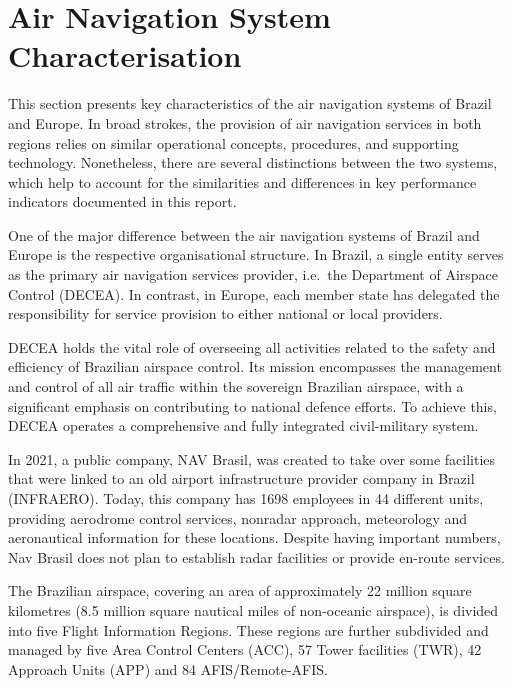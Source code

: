 \documentclass[
  a4paper,
  DIV=11,
  numbers=noendperiod]{scrreport}
\begin{document}

\hypertarget{air-navigation-system-characterisation}{%
\chapter{Air Navigation System
Characterisation}\label{air-navigation-system-characterisation}}

This section presents key characteristics of the air navigation systems
of Brazil and Europe. In broad strokes, the provision of air navigation
services in both regions relies on similar operational concepts,
procedures, and supporting technology. Nonetheless, there are several
distinctions between the two systems, which help to account for the
similarities and differences in key performance indicators documented in
this report.

One of the major difference between the air navigation systems of Brazil
and Europe is the respective organisational structure. In Brazil, a
single entity serves as the primary air navigation services provider,
i.e.~the Department of Airspace Control (DECEA). In contrast, in Europe,
each member state has delegated the responsibility for service provision
to either national or local providers.

DECEA holds the vital role of overseeing all activities related to the
safety and efficiency of Brazilian airspace control. Its mission
encompasses the management and control of all air traffic within the
sovereign Brazilian airspace, with a significant emphasis on
contributing to national defence efforts. To achieve this, DECEA
operates a comprehensive and fully integrated civil-military system.

In 2021, a public company, NAV Brasil, was created to take over some
facilities that were linked to an old airport infrastructure provider
company in Brazil (INFRAERO). Today, this company has 1698 employees in
44 different units, providing aerodrome control services, nonradar
approach, meteorology and aeronautical information for these locations.
Despite having important numbers, Nav Brasil does not plan to establish
radar facilities or provide en-route services.

The Brazilian airspace, covering an area of approximately 22 million
square kilometres (8.5 million square nautical miles of non-oceanic
airspace), is divided into five Flight Information Regions. These
regions are further subdivided and managed by five Area Control Centers
(ACC), 57 Tower facilities (TWR), 42 Approach Units (APP) and 84
AFIS/Remote-AFIS.
\end{document}
